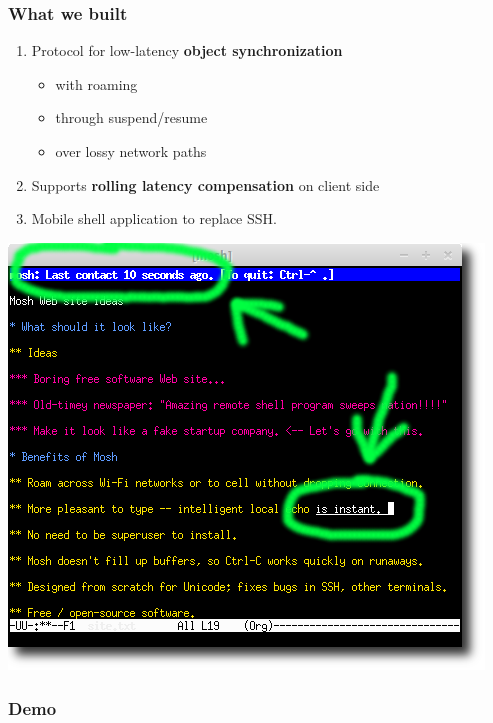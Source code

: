 \documentclass[svgnames]{beamer}
\begin{document}
\begin{frame}

\frametitle{What we built}

\begin{enumerate}

\item Protocol for low-latency \textbf{object synchronization}

\begin{itemize}
\item with roaming
\item through suspend/resume
\item over lossy network paths
\end{itemize}

\item Supports \textbf{rolling latency compensation} on client side

\item Mobile shell application to replace SSH.

\end{enumerate}

\end{frame}

\begin{frame}

\noindent \includegraphics[scale=.5]{mosh.png}

\end{frame}

\begin{frame}
\frametitle{Demo}

\end{frame}
\end{document}
